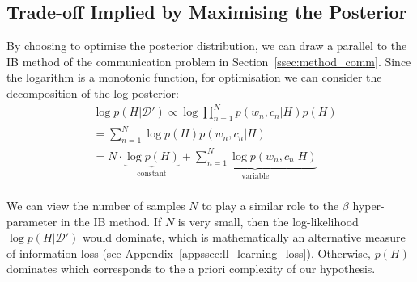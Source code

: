 \documentclass[11pt]{article}
\begin{document}
\subsection{Trade-off Implied by Maximising the Posterior}
\label{sssec:learn_tradeoff}


By choosing to optimise the posterior distribution, we can draw a parallel to the IB method of the communication problem in Section~\ref{ssec:method_comm}. 
Since the logarithm is a monotonic function, for optimisation we can consider the decomposition of the log-posterior:
\begin{align*}
        & \log p(H|\mathcal{D'}) \propto \log \prod_{n=1}^{N} p(w_n, c_n|H)p(H) \\
        &  =\sum_{n=1}^{N} \log p(H) p(w_n, c_n|H) \\
        &  =N\cdot\underbrace{\log p(H)}_{\text{constant}} + \underbrace{\sum_{n=1}^{N} \log p(w_n, c_n|H)}_{\text{variable}} \\
    \label{eq:learning_objective_log_pH_D}
\end{align*}

We can view the number of samples $N$ to play a similar role to the $\beta$ hyper-parameter in the IB method. 
If $N$ is very small, then the log-likelihood $\log p(H|\mathcal{D}')$ would dominate, which is mathematically an alternative measure of information loss (see Appendix~\ref{appssec:ll_learning_loss}).
Otherwise, $p(H)$ dominates which corresponds to the a priori complexity of our hypothesis.
\end{document}
